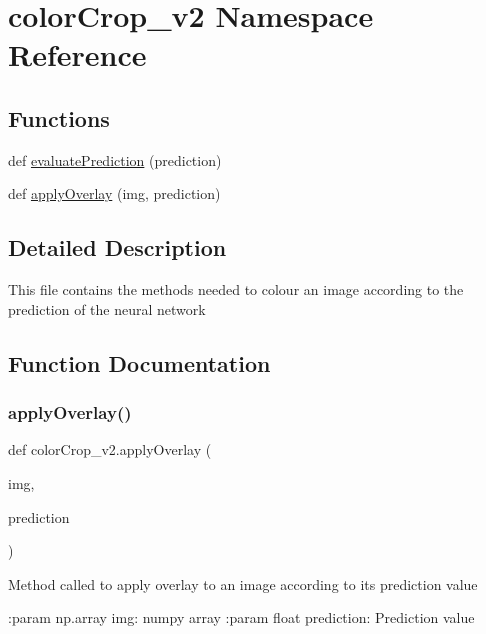\hypertarget{namespacecolorCrop__v2}{}\section{color\+Crop\+\_\+v2 Namespace Reference}
\label{namespacecolorCrop__v2}
\subsection*{Functions}
\begin{DoxyCompactItemize}
\item 
def \mbox{\hyperlink{namespacecolorCrop__v2_a9d918ed3cd2a8d29294f8569a5d8507e}{evaluate\+Prediction}} (prediction)
\item 
def \mbox{\hyperlink{namespacecolorCrop__v2_a515a35882591be38d4648a9102222969}{apply\+Overlay}} (img, prediction)
\end{DoxyCompactItemize}


\subsection{Detailed Description}
\begin{DoxyVerb}This file contains the methods needed to colour an image according to the prediction of the neural network
\end{DoxyVerb}
 

\subsection{Function Documentation}
\mbox{\label{namespacecolorCrop__v2_a515a35882591be38d4648a9102222969}} 
\subsubsection{\texorpdfstring{apply\+Overlay()}{applyOverlay()}}
{\footnotesize\ttfamily def color\+Crop\+\_\+v2.\+apply\+Overlay (\begin{DoxyParamCaption}\item[{}]{img,  }\item[{}]{prediction }\end{DoxyParamCaption})}

\begin{DoxyVerb}Method called to apply overlay to an image according to its prediction value

:param np.array img: numpy array
:param float prediction: Prediction value
\end{DoxyVerb}
 \mbox{\label{namespacecolorCrop__v2_a9d918ed3cd2a8d29294f8569a5d8507e}} 
